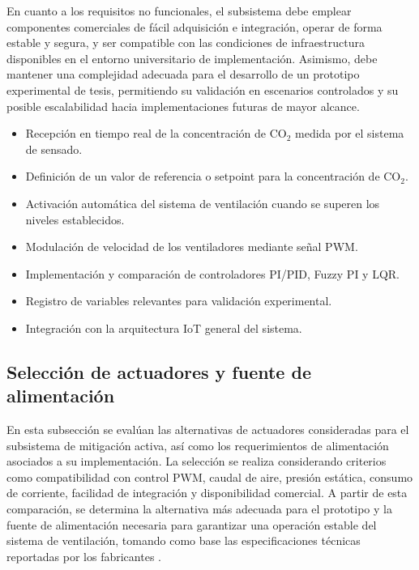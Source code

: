 En cuanto a los requisitos no funcionales, el subsistema debe emplear componentes comerciales de fácil adquisición e integración, operar de forma estable y segura, y ser compatible con las condiciones de infraestructura disponibles en el entorno universitario de implementación. Asimismo, debe mantener una complejidad adecuada para el desarrollo de un prototipo experimental de tesis, permitiendo su validación en escenarios controlados y su posible escalabilidad hacia implementaciones futuras de mayor alcance.


\begin{itemize}
    \item Recepción en tiempo real de la concentración de CO$_2$ medida por el sistema de sensado.
    \item Definición de un valor de referencia o setpoint para la concentración de CO$_2$.
    \item Activación automática del sistema de ventilación cuando se superen los niveles establecidos.
    \item Modulación de velocidad de los ventiladores mediante señal PWM.
    \item Implementación y comparación de controladores PI/PID, Fuzzy PI y LQR.
    \item Registro de variables relevantes para validación experimental.
    \item Integración con la arquitectura IoT general del sistema.
\end{itemize}



\subsection{Selección de actuadores y fuente de alimentación}

En esta subsección se evalúan las alternativas de actuadores consideradas para el subsistema de mitigación activa, así como los requerimientos de alimentación asociados a su implementación. La selección se realiza considerando criterios como compatibilidad con control PWM, caudal de aire, presión estática, consumo de corriente, facilidad de integración y disponibilidad comercial. A partir de esta comparación, se determina la alternativa más adecuada para el prototipo y la fuente de alimentación necesaria para garantizar una operación estable del sistema de ventilación, tomando como base las especificaciones técnicas reportadas por los fabricantes \cite{cm_sickleflow_2026, cm_mf120_halo_2026, cm_mf120_lite_2026, delta_pfb1224uhep0_2026}.

